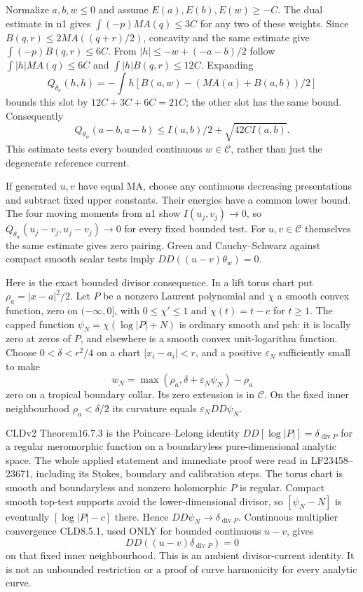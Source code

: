 \documentclass[11pt]{article}
\begin{document}
Normalize $a,b,w\leq0$ and assume $E(a),E(b),E(w)\geq-C$. The dual estimate in n1 gives $\int(-p)MA(q)\leq3C$ for any two of these weights. Since $B(q,r)\leq2MA((q+r)/2)$, concavity and the same estimate give $\int(-p)B(q,r)\leq6C$. From $|h|\leq-w+(-a-b)/2$ follow $\int|h|MA(q)\leq6C$ and $\int|h|B(q,r)\leq12C$. Expanding
\[
 Q_{\theta_a}(h,h)
 =-\int h\left[B(a,w)-(MA(a)+B(a,b))/2\right]
\]
bounds this slot by $12C+3C+6C=21C$; the other slot has the same bound. Consequently
\[
 Q_{\theta_w}(a-b,a-b)\leq I(a,b)/2+\sqrt{42C I(a,b)}.
\]
This estimate tests every bounded continuous $w\in\mathcal C$, rather than just the degenerate reference current.

If generated $u,v$ have equal MA, choose any continuous decreasing presentations and subtract fixed upper constants. Their energies have a common lower bound. The four moving moments from n1 show $I(u_j,v_j)\to0$, so $Q_{\theta_w}(u_j-v_j,u_j-v_j)\to0$ for every fixed bounded test. For $u,v\in\mathcal C$ themselves the same estimate gives zero pairing. Green and Cauchy--Schwarz against compact smooth scalar tests imply $DD((u-v)\theta_w)=0$.

Here is the exact bounded divisor consequence. In a lift torus chart put $\rho_a=|x-a|^2/2$. Let $P$ be a nonzero Laurent polynomial and $\chi$ a smooth convex function, zero on $(-\infty,0]$, with $0\leq\chi'\leq1$ and $\chi(t)=t-c$ for $t\geq1$. The capped function $\psi_N=\chi(\log|P|+N)$ is ordinary smooth and psh: it is locally zero at zeros of $P$, and elsewhere is a smooth convex unit-logarithm function. Choose $0<\delta<r^2/4$ on a chart $|x_i-a_i|<r$, and a positive $\varepsilon_N$ sufficiently small to make
\[
 w_N=\max(\rho_a,\delta+\varepsilon_N\psi_N)-\rho_a
\]
zero on a tropical boundary collar. Its zero extension is in $\mathcal C$. On the fixed inner neighbourhood $\rho_a<\delta/2$ its curvature equals $\varepsilon_N DD\psi_N$.

CLDv2 Theorem16.7.3 is the Poincare--Lelong identity $DD[\log|P|]=\delta_{\operatorname{div}P}$ for a regular meromorphic function on a boundaryless pure-dimensional analytic space. The whole applied statement and immediate proof were read in LF23458--23671, including its Stokes, boundary and calibration steps. The torus chart is smooth and boundaryless and nonzero holomorphic $P$ is regular. Compact smooth top-test supports avoid the lower-dimensional divisor, so $[\psi_N-N]$ is eventually $[\log|P|-c]$ there. Hence $DD\psi_N\to\delta_{\operatorname{div}P}$. Continuous multiplier convergence CLD8.5.1, used ONLY for bounded continuous $u-v$, gives
\[
 DD((u-v)\delta_{\operatorname{div}P})=0
\]
on that fixed inner neighbourhood. This is an ambient divisor-current identity. It is not an unbounded restriction or a proof of curve harmonicity for every analytic curve.
\end{document}
